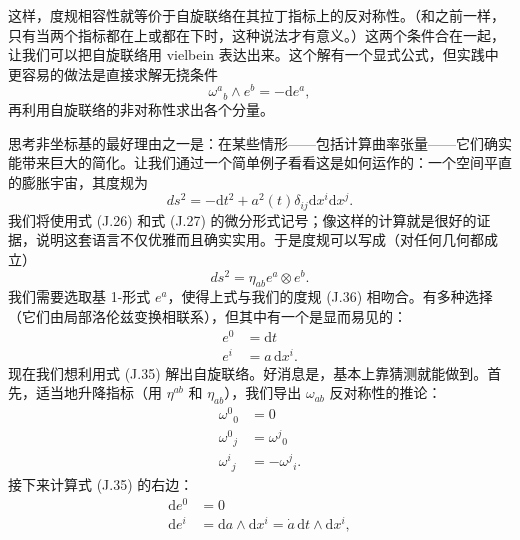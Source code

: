 这样，度规相容性就等价于自旋联络在其拉丁指标上的反对称性。（和之前一样，只有当两个指标都在上或都在下时，这种说法才有意义。）这两个条件合在一起，让我们可以把自旋联络用 vielbein 表达出来。这个解有一个显式公式，但实践中更容易的做法是直接求解无挠条件
\begin{equation*}
\omega^{a}{}_{b}\wedge e^{b} = -\mathrm{d}e^{a},
\tag{J.35}
\end{equation*}
再利用自旋联络的非对称性求出各个分量。

思考非坐标基的最好理由之一是：在某些情形——包括计算曲率张量——它们确实能带来巨大的简化。让我们通过一个简单例子看看这是如何运作的：一个空间平直的膨胀宇宙，其度规为
\begin{equation*}
ds^{2} = -\mathrm{d}t^{2} + a^{2}(t)\delta_{ij}\mathrm{d}x^{i}\mathrm{d}x^{j}.
\tag{J.36}
\end{equation*}
我们将使用式 (J.26) 和式 (J.27) 的微分形式记号；像这样的计算就是很好的证据，说明这套语言不仅优雅而且确实实用。于是度规可以写成（对任何几何都成立）
\begin{equation*}
ds^{2} = \eta_{ab}e^{a}\otimes e^{b}.
\tag{J.37}
\end{equation*}
我们需要选取基 1-形式 $e^{a}$，使得上式与我们的度规 (J.36) 相吻合。有多种选择（它们由局部洛伦兹变换相联系），但其中有一个是显而易见的：
\begin{align*}
e^{0} &= \mathrm{d}t \\
e^{i} &= a\,\mathrm{d}x^{i}. \tag{J.38}
\end{align*}
现在我们想利用式 (J.35) 解出自旋联络。好消息是，基本上靠猜测就能做到。首先，适当地升降指标（用 $\eta^{ab}$ 和 $\eta_{ab}$），我们导出 $\omega_{ab}$ 反对称性的推论：
\begin{align*}
\omega^{0}{}_{0} &= 0 \\
\omega^{0}{}_{j} &= \omega^{j}{}_{0} \\
\omega^{i}{}_{j} &= -\omega^{j}{}_{i}. \tag{J.39}
\end{align*}
接下来计算式 (J.35) 的右边：
\begin{align*}
\mathrm{d}e^{0} &= 0 \\
\mathrm{d}e^{i} &= \mathrm{d}a\wedge\mathrm{d}x^{i} = \dot{a}\,\mathrm{d}t\wedge\mathrm{d}x^{i}, \tag{J.40}
\end{align*}

